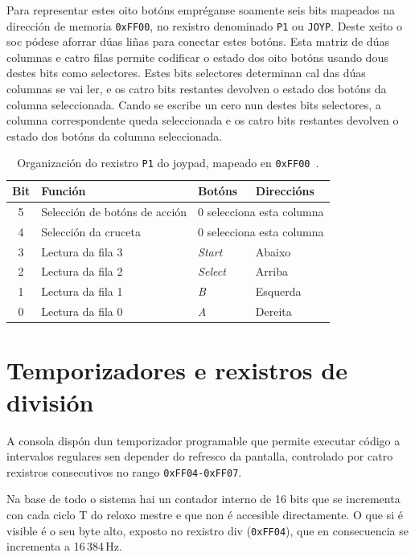Para representar estes oito botóns empréganse soamente seis bits mapeados na dirección de memoria \texttt{0xFF00},
no rexistro denominado \texttt{P1} ou \texttt{JOYP}.
Deste xeito o \acrshort{soc} pódese aforrar dúas liñas para conectar estes botóns.
Esta matriz de dúas columnas e catro filas permite codificar o estado dos oito botóns usando dous destes bits
como selectores. Estes bits selectores determinan cal das dúas columnas se vai ler, e os catro bits restantes devolven o estado dos botóns da columna seleccionada.
Cando se escribe un cero nun destes bits selectores, a columna correspondente queda seleccionada e os catro bits restantes devolven o estado dos botóns da columna seleccionada.


\begin{table}[htbp]
  \centering
  \begin{tabular}{c|l|l|l}
  \rowcolor{udcpink!25}
  \textbf{Bit} & \textbf{Función} & \textbf{Botóns} & \textbf{Direccións} \\\hline
  5 & Selección de botóns de acción & \multicolumn{2}{c}{0 selecciona esta columna} \\
  4 & Selección da cruceta          & \multicolumn{2}{c}{0 selecciona esta columna} \\
  3 & Lectura da fila 3             & \textit{Start}  & Abaixo \\
  2 & Lectura da fila 2             & \textit{Select} & Arriba \\
  1 & Lectura da fila 1             & \textit{B}      & Esquerda \\
  0 & Lectura da fila 0             & \textit{A}      & Dereita \\
  \end{tabular}
  \caption{Organización do rexistro \texttt{P1} do joypad, mapeado en \texttt{0xFF00}~\cite{pandocs}.}
  \label{tab:joypad}
\end{table}

\section{Temporizadores e rexistros de división}
\label{sec:temporizadores}

A consola dispón dun temporizador programable que permite executar código a intervalos
regulares sen depender do refresco da pantalla, controlado por catro rexistros
consecutivos no rango \texttt{0xFF04-0xFF07}.

Na base de todo o sistema hai un contador interno de 16 bits que se incrementa con cada
ciclo T do reloxo mestre e que non é accesible directamente.
O que si é visible é o seu byte alto, exposto no rexistro \acrfull{div} (\texttt{0xFF04}),
que en consecuencia se incrementa a 16\,384\,Hz.

